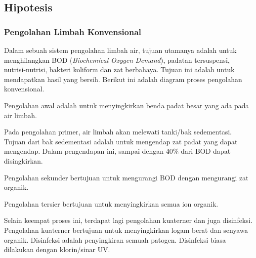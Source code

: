 \documentclass[10pt,a4paper,hidelinks]{article}
\begin{document}
    \subsection{Hipotesis}
    \subsubsection{Pengolahan Limbah Konvensional}
    Dalam sebuah sistem pengolahan limbah air, tujuan utamanya adalah untuk menghilangkan BOD (\textit{Biochemical Oxygen Demand}), padatan tersuspensi, nutrisi-nutrisi, bakteri koliform dan zat berbahaya. Tujuan ini adalah untuk mendapatkan hasil yang bersih. Berikut ini adalah diagram proses pengolahan konvensional.
    
    \begin{center}
    \end{center}
    Pengolahan awal adalah untuk menyingkirkan benda padat besar yang ada pada air limbah.
    
    Pada pengolahan primer, air limbah akan melewati tanki/bak sedementasi. Tujuan dari bak sedementasi adalah untuk mengendap zat padat yang dapat mengendap. Dalam pengendapan ini, sampai dengan 40\% dari BOD dapat disingkirkan.
     
    Pengolahan sekunder bertujuan untuk mengurangi BOD dengan mengurangi zat organik.
    
    Pengolahan tersier bertujuan untuk menyingkirkan semua ion organik.
    
    Selain keempat proses ini, terdapat lagi pengolahan kuaterner dan juga disinfeksi. Pengolahan kuaterner bertujuan untuk menyingkirkan logam berat dan senyawa organik. Disinfeksi adalah penyingkiran semuah patogen. Disinfeksi biasa dilakukan dengan klorin/sinar UV.
\end{document}
